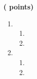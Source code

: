 \documentclass[12pt,french]{book}
\begin{document}
\begin{spacing}{1.2}
\medskip\exercice \hfill \textbf{( points)}\par
\begin{enumerate}[label=\arabic*.]
\item 
	\begin{enumerate}[label=\alph*)]
		
	\item 

		
	\item
	
	\end{enumerate}

\item 
\begin{enumerate}[label=\alph*)]
	\item 
	
	\item 
	
		
	\end{enumerate}

\end{enumerate}





%



\end{spacing}
\end{document}

